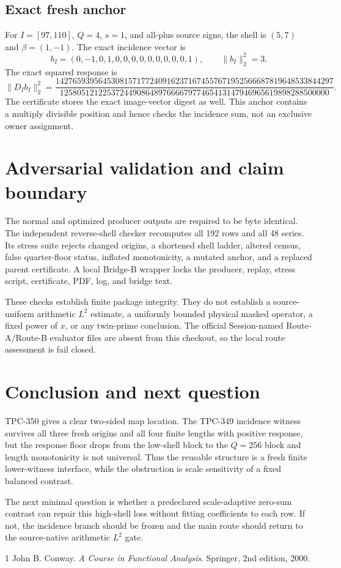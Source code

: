 \documentclass[10pt]{article}
\begin{document}
\subsection{Exact fresh anchor}

For $I=[97,110]$, $Q=4$, $s=1$, and all-plus source signs, the shell is
$(5,7)$ and $\beta=(1,-1)$.  The exact incidence vector is
\[
 b_I=(0,-1,0,1,0,0,0,0,0,0,0,0,0,1),
 \qquad \|b_I\|_2^2=3.
\]
The exact squared response is
\[
 \|D_Ib_I\|_2^2=
 \frac{14276593956453081571772409162371674557671952566687819648533844297}
 {125805121225372449086489766667977465413147946965619898288500000}.
\]
The certificate stores the exact image-vector digest as well.  This anchor
contains a multiply divisible position and hence checks the incidence sum,
not an exclusive owner assignment.

\section{Adversarial validation and claim boundary}

The normal and optimized producer outputs are required to be byte identical.
The independent reverse-shell checker recomputes all 192 rows and all 48
series.  Its stress suite rejects changed origins, a shortened shell ladder,
altered census, false quarter-floor status, inflated monotonicity, a mutated
anchor, and a replaced parent certificate.  A local Bridge-B wrapper locks the
producer, replay, stress script, certificate, PDF, log, and bridge text.

These checks establish finite package integrity.  They do not establish a
source-uniform arithmetic $L^2$ estimate, a uniformly bounded physical masked
operator, a fixed power of $x$, or any twin-prime conclusion.  The official
Session-named Route-A/Route-B evaluator files are absent from this checkout,
so the local route assessment is fail closed.

\section{Conclusion and next question}

TPC-350 gives a clear two-sided map location.  The TPC-349 incidence witness
survives all three fresh origins and all four finite lengths with positive
response, but the response floor drops from the low-shell block to the
$Q=256$ block and length monotonicity is not universal.  Thus the reusable
structure is a fresh finite lower-witness interface, while the obstruction is
scale sensitivity of a fixed balanced contrast.

The next minimal question is whether a predeclared scale-adaptive zero-sum
contrast can repair this high-shell loss without fitting coefficients to each
row.  If not, the incidence branch should be frozen and the main route should
return to the source-native arithmetic $L^2$ gate.

\begin{thebibliography}{1}
John B. Conway. \emph{A Course in Functional Analysis}. Springer, 2nd edition,
2000.
\end{thebibliography}
\end{document}
